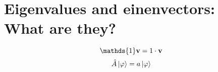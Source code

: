 


\section*{Eigenvalues and einenvectors: What are they?}

$$\mathds{1} \vb{v} = 1 \cdot \vb{v}$$ 
$$\hat A \ket{\varphi} = a \ket{\varphi}$$ 



